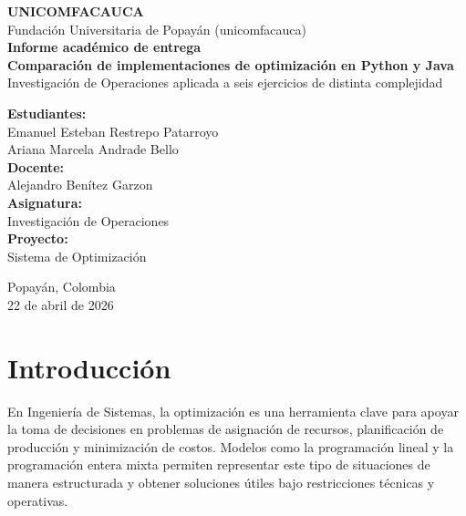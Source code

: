 \documentclass[12pt,a4paper]{article}
\begin{document}
\begin{titlepage}
	\centering
	\vspace*{1.5cm}

	{\Large \textbf{UNICOMFACAUCA}}\\[0.4cm]
	{\large Fundación Universitaria de Popayán (unicomfacauca)}\\[1.2cm]

	{\large \textbf{Informe académico de entrega}}\\[0.3cm]
	{\Large \textbf{Comparación de implementaciones de optimización en Python y Java}}\\[0.2cm]
	{\large Investigación de Operaciones aplicada a seis ejercicios de distinta complejidad}\\[1.3cm]

	\begin{flushleft}
		{\bfseries Estudiantes:}\\
		Emanuel Esteban Restrepo Patarroyo\\
		Ariana Marcela Andrade Bello\\[0.6cm]

		{\bfseries Docente:}\\
		Alejandro Benítez Garzon\\[0.6cm]

		{\bfseries Asignatura:}\\
		Investigación de Operaciones\\[0.6cm]

		{\bfseries Proyecto:}\\
		Sistema de Optimización
	\end{flushleft}

	\vfill
	{\large Popayán, Colombia}\\
	{\large 22 de abril de 2026}
\end{titlepage}

\tableofcontents
\newpage
\newpage

\section{Introducción}

En Ingeniería de Sistemas, la optimización es una herramienta clave para apoyar la toma de decisiones en problemas de asignación de recursos, planificación de producción y minimización de costos. Modelos como la programación lineal y la programación entera mixta permiten representar este tipo de situaciones de manera estructurada y obtener soluciones útiles bajo restricciones técnicas y operativas.
\end{document}
